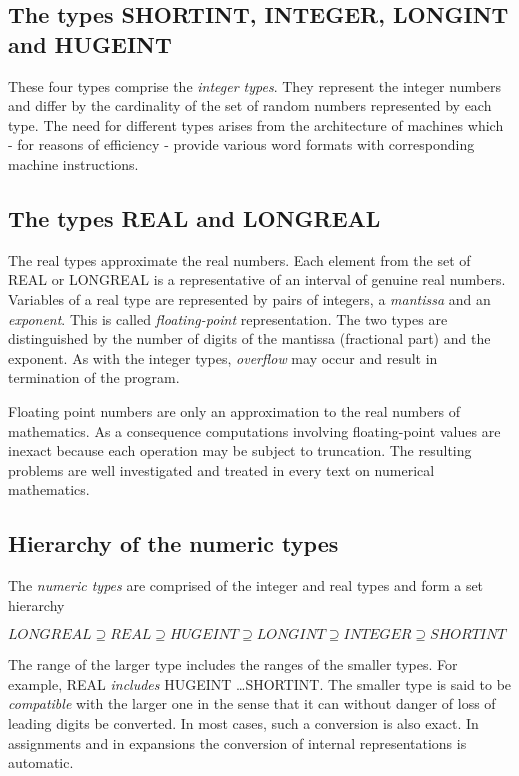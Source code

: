 \documentclass[a4paper,11pt]{article}
\begin{document}
\subsection{The types SHORTINT, INTEGER, LONGINT and HUGEINT}\label{subsection:IntegerTypes}
These four types comprise the {\em integer types}. They represent the integer numbers and differ by the cardinality of the set of random numbers represented by each type. The need for different types arises from the architecture of machines which - for reasons of efficiency - provide various word formats with corresponding machine instructions.

\subsection{The types REAL and LONGREAL} \label{subsection:RealTypes}
The real types approximate the real numbers. Each element from the set of REAL or LONGREAL is a representative of an interval of genuine real numbers. Variables of a real type are represented by pairs of integers, a {\em mantissa} and an {\em exponent}. This is called {\em floating-point} representation. The two types are distinguished by the number of digits of the mantissa (fractional part) and the exponent. As with the integer types, {\em overflow} may occur and result in termination of the program.

Floating point numbers are only an approximation to the real numbers of mathematics. As a consequence computations involving floating-point values are inexact because each operation may be subject to truncation. The resulting problems are well investigated and treated in every text on numerical mathematics.

\subsection{Hierarchy of the numeric types} \label{subsection:HierarchyNumericTypes}
The {\em numeric types} are comprised of the integer and real types and form a set hierarchy

$LONGREAL \supseteq REAL \supseteq HUGEINT \supseteq LONGINT \supseteq INTEGER \supseteq SHORTINT$

The range of the larger type includes the ranges of the smaller types. For example, REAL {\em includes} HUGEINT \ldots SHORTINT. The smaller type is said to be {\em compatible} with the larger one in the sense that it can without danger of loss of leading digits be converted. In most cases, such a conversion is also exact. In assignments and in expansions the conversion of internal representations is automatic.
\end{document}
